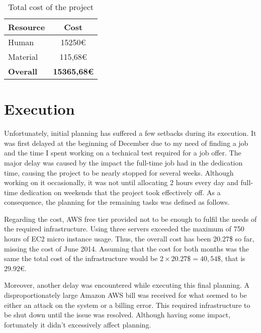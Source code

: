 \begin{table}[H]
    \centering
    \begin{tabular}{|l|c|}
    \hline
    \textbf{Resource}   & \textbf{Cost} \\ \hline
    Human               & 15250\euro{}   \\ \hline
    Material            & 115,68\euro{}   \\ \hline
    \textbf{Overall}    & \textbf{15365,68\euro{}} \\ \hline
    \end{tabular}
    \caption{Total cost of the project}
    \label{tab:total_cost}
\end{table}

\section{Execution}

Unfortunately, initial planning has suffered a few setbacks during its execution. It was first delayed at the beginning of December due to my need of finding a job and the time I spent working on a technical test required for a job offer. The major delay was caused by the impact the full-time job had in the dedication time, causing the project to be nearly stopped for several weeks. Although working on it occasionally, it was not until allocating 2 hours every day and full-time dedication on weekends that the project took effectively off. As a consequence, the planning for the remaining tasks was defined as follows.

Regarding the cost, AWS free tier provided not to be enough to fulfil the needs of the required infrastructure. Using three servers exceeded the maximum of 750 hours of EC2 micro instance usage. Thus, the overall cost has been 20.27\$ so far, missing the cost of June 2014. Assuming that the cost for both months was the same the total cost of the infrastructure would be $2 \times 20.27\$ = 40,54\$$, that is $29.92\euro$.

Moreover, another delay was encountered while executing this final planning. A disproportionately large Amazon AWS bill was received for what seemed to be either an attack on the system or a billing error. This required infrastructure to be shut down until the issue was resolved. Although having some impact, fortunately it didn't excessively affect planning.

